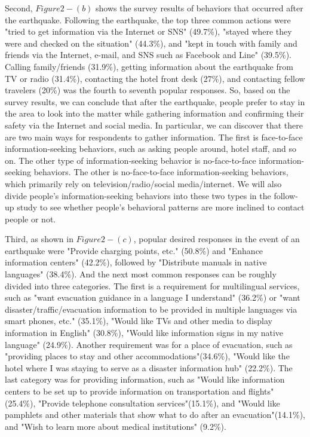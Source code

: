 Second, $Figure 2 - (b)$ shows the survey results of behaviors that occurred after the earthquake. Following the earthquake, the top three common actions were "tried to get information via the Internet or SNS" (49.7\%), "stayed where they were and checked on the situation" (44.3\%), and "kept in touch with family and friends via the Internet, e-mail, and SNS such as Facebook and Line" (39.5\%). Calling family/friends (31.9\%), getting information about the earthquake from TV or radio (31.4\%), contacting the hotel front desk (27\%), and contacting fellow travelers (20\%) was the fourth to seventh popular responses. So, based on the survey results, we can conclude that after the earthquake, people prefer to stay in the area to look into the matter while gathering information and confirming their safety via the Internet and social media. In particular, we can discover that there are two main ways for respondents to gather information. The first is face-to-face information-seeking behaviors, such as asking people around, hotel staff, and so on. The other type of information-seeking behavior is no-face-to-face information-seeking behaviors. The other is no-face-to-face information-seeking behaviors, which primarily rely on television/radio/social media/internet. We will also divide people's information-seeking behaviors into these two types in the follow-up study to see whether people's behavioral patterns are more inclined to contact people or not.

Third, as shown in $Figure 2 - (c)$, popular desired responses in the event of an earthquake were "Provide charging points, etc." (50.8\%) and "Enhance information centers" (42.2\%), followed by "Distribute manuals in native languages" (38.4\%). And the next most common responses can be roughly divided into three categories. The first is a requirement for multilingual services, such as "want evacuation guidance in a language I understand" (36.2\%) or "want disaster/traffic/evacuation information to be provided in multiple languages via smart phones, etc." (35.1\%), "Would like TVs and other media to display information in English" (30.8\%), "Would like information signs in my native language" (24.9\%). Another requirement was for a place of evacuation, such as "providing places to stay and other accommodations"(34.6\%), "Would like the hotel where I was staying to serve as a disaster information hub" (22.2\%). The last category was for providing information, such as "Would like information centers to be set up to provide information on transportation and flights" (25.4\%), "Provide telephone consultation services"(15.1\%), and "Would like pamphlets and other materials that show what to do after an evacuation"(14.1\%), and "Wish to learn more about medical institutions" (9.2\%).

